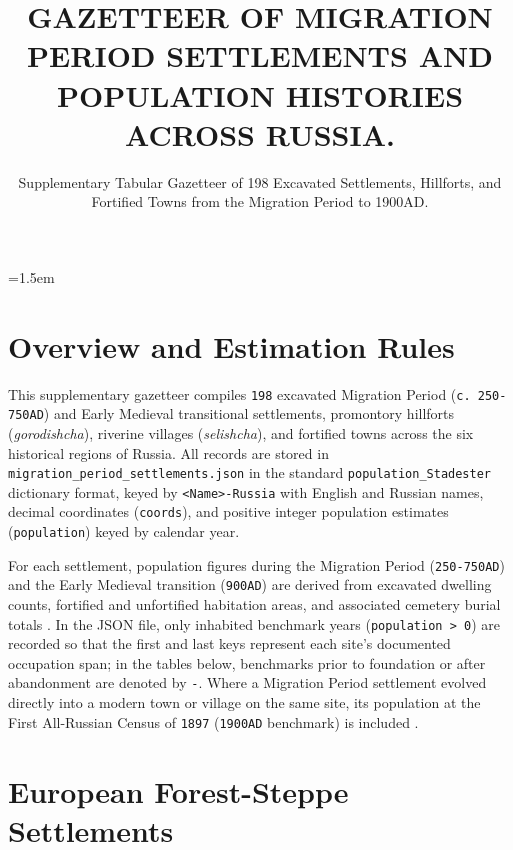 \documentclass[10pt,onecolumn]{intellte}
\title{GAZETTEER OF MIGRATION PERIOD SETTLEMENTS AND POPULATION
HISTORIES ACROSS RUSSIA.}
\subtitle{Supplementary Tabular Gazetteer of 198 Excavated Settlements,
Hillforts, and Fortified Towns from the Migration Period to 1900AD.}
\begin{document}
\makeatletter
\ifdefined\crd@orig@hyper@linkurl
  \let\hyper@linkurl\crd@orig@hyper@linkurl
\fi
\makeatother
{}
\emergencystretch=1.5em


\maketitle
\pagestyle{empty}
\thispagestyle{empty}

\section{Overview and Estimation
Rules}\label{overview-and-estimation-rules}

This supplementary gazetteer compiles \texttt{198} excavated Migration
Period (\texttt{c.\ 250-750AD}) and Early Medieval transitional
settlements, promontory hillforts (\emph{gorodishcha}), riverine
villages (\emph{selishcha}), and fortified towns across the six
historical regions of Russia. All records are stored in
\texttt{migration\_period\_settlements.json} in the standard
\texttt{population\_Stadester} dictionary format, keyed by
\texttt{\textless{}Name\textgreater{}-Russia} with English and Russian
names, decimal coordinates (\texttt{coords}), and positive integer
population estimates (\texttt{population}) keyed by calendar year.

For each settlement, population figures during the Migration Period
(\texttt{250-750AD}) and the Early Medieval transition (\texttt{900AD})
are derived from excavated dwelling counts, fortified and unfortified
habitation areas, and associated cemetery burial totals
.
In the JSON file, only inhabited benchmark years
(\texttt{population\ \textgreater{}\ 0}) are recorded so that the first
and last keys represent each site's documented occupation span; in the
tables below, benchmarks prior to foundation or after abandonment are
denoted by \texttt{-}. Where a Migration Period settlement evolved
directly into a modern town or village on the same site, its population
at the First All-Russian Census of \texttt{1897} (\texttt{1900AD}
benchmark) is included .

\section{European Forest-Steppe
Settlements}\label{european-forest-steppe-settlements}
\end{document}
